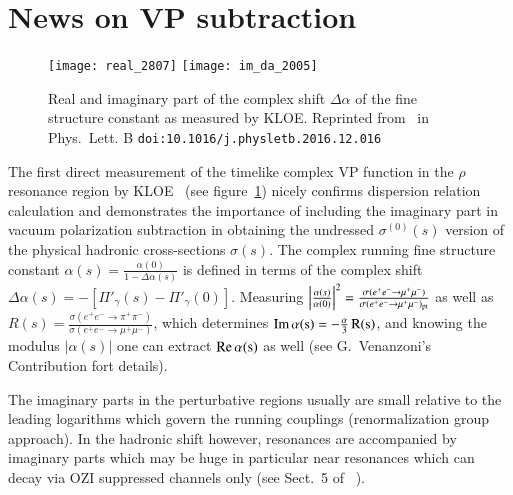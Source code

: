 \documentclass[epj,onecolumn]{webofc}
\newcommand{\epm}{e^+e^- }
\newcommand{\Impa}{\rm Im }
\newcommand{\Repa}{\rm Re }
\begin{document}
\section{News on VP subtraction}
\begin{figure}[h]
\vspace*{-4mm}
\centering
\texttt{[image: real\_2807]}
\texttt{[image: im\_da\_2005]}
\caption{Real and imaginary part of the complex shift $\Delta \alpha$
of the fine structure constant as measured by KLOE. Reprinted from~\cite{Anastasi2016bvn}
in Phys.\ Lett. B {\tt doi:10.1016/j.physletb.2016.12.016}}
\label{fig:dalpKLOE}
\end{figure}
The first direct measurement of the timelike complex VP function in the $\rho$
resonance region by KLOE~\cite{Anastasi2016bvn} (see
figure~\ref{fig:dalpKLOE}) nicely confirms
dispersion relation calculation and demonstrates the importance of
including the imaginary part in vacuum polarization subtraction in
obtaining the undressed $\sigma^{(0)}(s)$ version of the physical
hadronic cross-sections $\sigma(s)$. The
complex running fine structure constant
$\alpha(s)=\frac{\alpha(0)}{1-\Delta \alpha(s)}$ is defined in terms
of the complex shift $\Delta \alpha(s)=-[\Pi'_\gamma(s)-\Pi'_\gamma(0)]$.
Measuring $\left|\frac{\alpha(s)}{\alpha(0)}\right|^2=\frac{\sigma(\epm \to \mu^+\mu^-)}
{\sigma(\epm \to \mu^+\mu^-)_{\rm pt}}$
as well as
$R(s)=\frac{\sigma(\epm \to \pi^+\pi^-)}{\sigma(\epm \to
\mu^+\mu^-)}$, which determines $\Impa\,
\alpha(s)=-\frac{\alpha}{3}\,R(s)$, and knowing the modulus $|\alpha(s)|$ one
can extract $\Repa\, \alpha(s)$ as well (see G.~Venanzoni's
Contribution fort details).

The imaginary parts in the perturbative regions usually are small
relative to the leading logarithms which govern the running couplings
(renormalization group approach). In the hadronic shift however,
resonances are accompanied by imaginary parts which may be huge
in particular near resonances which can decay via OZI suppressed
channels only (see Sect.~5 of ~\cite{Jegerlehner:2015stw}).
\end{document}
